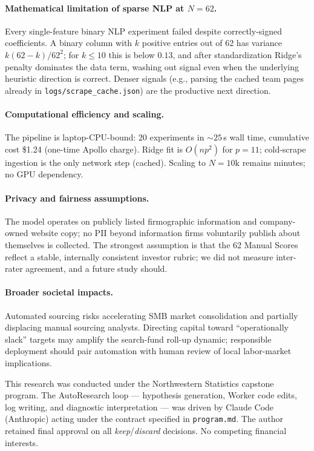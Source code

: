 \documentclass{article}
\begin{document}
\paragraph{Mathematical limitation of sparse NLP at $N{=}62$.}
Every single-feature binary NLP experiment failed despite correctly-signed coefficients.
A binary column with $k$ positive entries out of 62 has variance $k(62-k)/62^{2}$; for
$k \le 10$ this is below $0.13$, and after standardization Ridge's penalty dominates the
data term, washing out signal even when the underlying heuristic direction is correct.
Denser signals (e.g., parsing the cached team pages already in
\texttt{logs/scrape\_cache.json}) are the productive next direction.

\paragraph{Computational efficiency and scaling.}
The pipeline is laptop-CPU-bound: 20 experiments in $\sim 25$\,s wall time, cumulative
cost \$1.24 (one-time Apollo charge). Ridge fit is $O(np^{2})$ for $p{=}11$; cold-scrape
ingestion is the only network step (cached). Scaling to $N{=}10\text{k}$ remains minutes;
no GPU dependency.

\paragraph{Privacy and fairness assumptions.}
The model operates on publicly listed firmographic information and company-owned website
copy; no PII beyond information firms voluntarily publish about themselves is collected.
The strongest assumption is that the 62 Manual Scores reflect a stable, internally
consistent investor rubric; we did not measure inter-rater agreement, and a future study
should.

\paragraph{Broader societal impacts.}
Automated sourcing risks accelerating SMB market consolidation and partially displacing
manual sourcing analysts. Directing capital toward ``operationally slack'' targets may
amplify the search-fund roll-up dynamic; responsible deployment should pair automation
with human review of local labor-market implications.

\begin{ack}
This research was conducted under the Northwestern Statistics capstone program. The
AutoResearch loop --- hypothesis generation, Worker code edits, log writing, and
diagnostic interpretation --- was driven by Claude Code (Anthropic) acting under the
contract specified in \texttt{program.md}. The author retained final approval on all
\emph{keep}/\emph{discard} decisions. No competing financial interests.
\end{ack}
\end{document}

